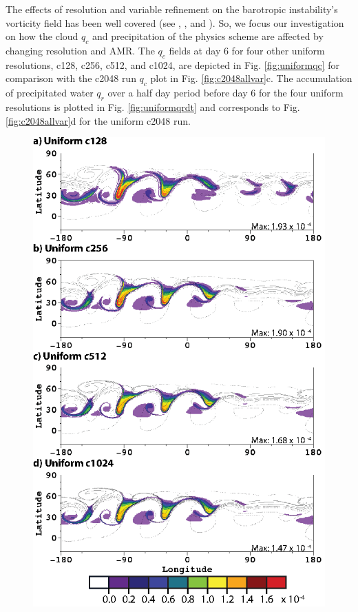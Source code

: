 The effects of resolution and variable refinement on the barotropic instability's vorticity
field has been well covered (see \cite{st2007comparison}, \cite{Weller:2009gl}, 
and \cite{scott2016test}). So, we focus our investigation on how the cloud $q_c$ and precipitation of the physics scheme are affected by changing resolution
and AMR. The $q_c$ fields at day 6 for four other uniform resolutions, c128, c256, c512, and
c1024, are depicted in Fig. \ref{fig:uniformqc} for comparison with the c2048 run $q_c$ plot 
in Fig. \ref{fig:c2048allvar}c. The accumulation of precipitated water $q_r$ over
a half day period before day 6 for the four uniform resolutions is plotted in Fig. \ref{fig:uniformqrdt}
and corresponds to Fig. \ref{fig:c2048allvar}d for the uniform c2048 run.

\begin{figure}
   \centerline{%
   \noindent
   \includegraphics[height=.9\textheight]{Chap2/A_qc_uniform-01}}

\end{figure}
